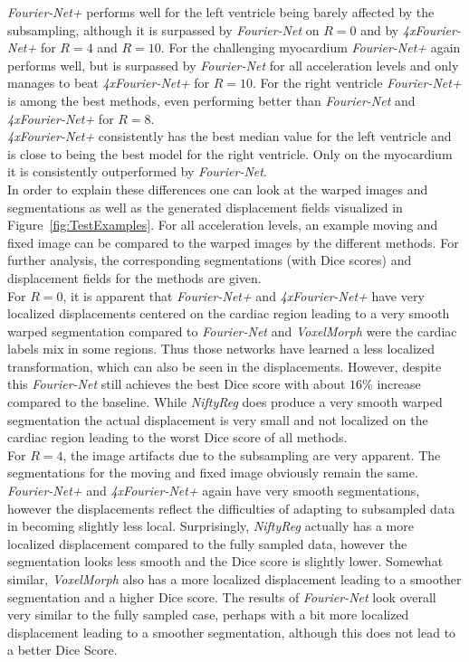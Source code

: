 \documentclass[english,version-2022-01]{uzl-thesis} %
\begin{document}
\emph{Fourier-Net+} performs well for the left ventricle being barely affected by the subsampling, although it is surpassed by \emph{Fourier-Net} on $R=0$ and by \emph{4xFourier-Net+} for $R=4$ and $R=10$. For the challenging myocardium \emph{Fourier-Net+} again performs well, but is surpassed by \emph{Fourier-Net} for all acceleration levels and only manages to beat \emph{4xFourier-Net+} for $R=10$. For the right ventricle \emph{Fourier-Net+} is among the best methods, even performing better than \emph{Fourier-Net} and \emph{4xFourier-Net+}  for $R=8$.\\
\emph{4xFourier-Net+} consistently has the best median value for the left ventricle and is close to being the best model for the right ventricle. Only on the myocardium it is consistently outperformed by \emph{Fourier-Net}.\\
In order to explain these differences one can look at the warped images and segmentations as well as the generated displacement fields visualized in Figure~\ref{fig:TestExamples}. For all acceleration levels, an example moving and fixed image can be compared to the warped images by the different methods. For further analysis, the corresponding segmentations (with Dice scores) and displacement fields for the methods are given.\\
For $R=0$, it is apparent that \emph{Fourier-Net+} and \emph{4xFourier-Net+} have very localized displacements centered on the cardiac region leading to a very smooth warped segmentation compared to \emph{Fourier-Net} and \emph{VoxelMorph} were the cardiac labels mix in some regions. Thus those networks have learned a less localized transformation, which can also be seen in the displacements. However, despite this \emph{Fourier-Net} still achieves the best Dice score with about $16\%$ increase compared to the baseline. While \emph{NiftyReg} does produce a very smooth warped segmentation the actual displacement is very small and not localized on the cardiac region leading to the worst Dice score of all methods.\\
For $R=4$, the image artifacts due to the subsampling are very apparent. The segmentations for the moving and fixed image obviously remain the same.
\emph{Fourier-Net+} and \emph{4xFourier-Net+} again have very smooth segmentations, however the displacements reflect the difficulties of adapting to subsampled data in becoming slightly less local. Surprisingly, \emph{NiftyReg} actually has a more localized displacement compared to the fully sampled data, however the segmentation looks less smooth and the Dice score is slightly lower. Somewhat similar, \emph{VoxelMorph} also has a more localized displacement leading to a smoother segmentation and a higher Dice score. The results of \emph{Fourier-Net} look overall very similar to the fully sampled case, perhaps with a bit more localized displacement leading to a smoother segmentation, although this does not lead to a better Dice Score.\\
\end{document}
